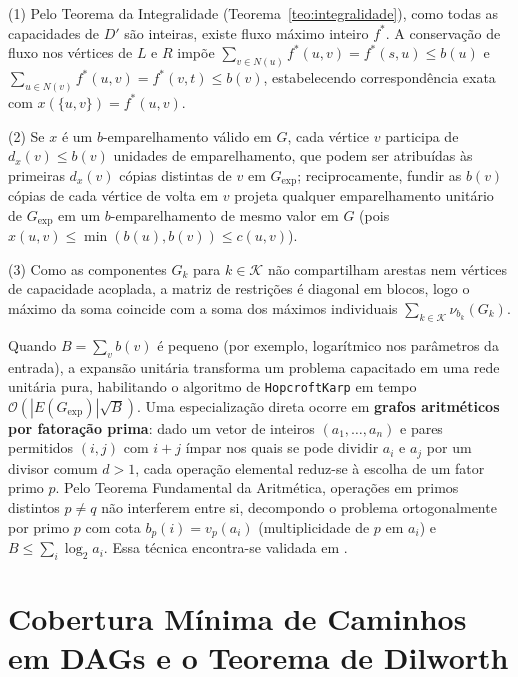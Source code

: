\begin{demonstracao}
(1) Pelo Teorema da Integralidade (Teorema~\ref{teo:integralidade}), como todas as capacidades de $D'$ são inteiras, existe fluxo máximo inteiro $f^*$. A conservação de fluxo nos vértices de $L$ e $R$ impõe $\sum_{v \in N(u)} f^*(u, v) = f^*(s, u) \le b(u)$ e $\sum_{u \in N(v)} f^*(u, v) = f^*(v, t) \le b(v)$, estabelecendo correspondência exata com $x(\{u, v\}) = f^*(u, v)$.

(2) Se $x$ é um $b$-emparelhamento válido em $G$, cada vértice $v$ participa de $d_x(v) \le b(v)$ unidades de emparelhamento, que podem ser atribuídas às primeiras $d_x(v)$ cópias distintas de $v$ em $G_{\text{exp}}$; reciprocamente, fundir as $b(v)$ cópias de cada vértice de volta em $v$ projeta qualquer emparelhamento unitário de $G_{\text{exp}}$ em um $b$-emparelhamento de mesmo valor em $G$ (pois $x(u, v) \le \min(b(u), b(v)) \le c(u, v)$).

(3) Como as componentes $G_k$ para $k \in \mathcal{K}$ não compartilham arestas nem vértices de capacidade acoplada, a matriz de restrições é diagonal em blocos, logo o máximo da soma coincide com a soma dos máximos individuais $\sum_{k \in \mathcal{K}} \nu_{b_k}(G_k)$.
\end{demonstracao}

 Quando $B = \sum_v b(v)$ é pequeno (por exemplo, logarítmico nos parâmetros da entrada), a expansão unitária transforma um problema capacitado em uma rede unitária pura, habilitando o algoritmo de \lstinline{HopcroftKarp} em tempo $\mathcal{O}(|E(G_{\text{exp}})|\sqrt{B})$. Uma especialização direta ocorre em \textbf{grafos aritméticos por fatoração prima}: dado um vetor de inteiros $(a_1, \dots, a_n)$ e pares permitidos $(i, j)$ com $i + j$ ímpar nos quais se pode dividir $a_i$ e $a_j$ por um divisor comum $d > 1$, cada operação elemental reduz-se à escolha de um fator primo $p$. Pelo Teorema Fundamental da Aritmética, operações em primos distintos $p \neq q$ não interferem entre si, decompondo o problema ortogonalmente por primo $p$ com cota $b_p(i) = v_p(a_i)$ (multiplicidade de $p$ em $a_i$) e $B \le \sum_i \log_2 a_i$. Essa técnica encontra-se validada em .


\section{Cobertura Mínima de Caminhos em DAGs e o Teorema de Dilworth}\label{sec:dag_dilworth}


